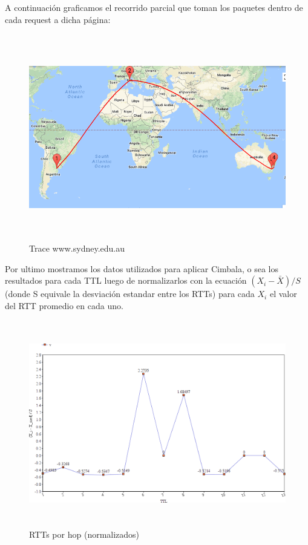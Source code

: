 \documentclass[a4paper,10pt]{article}
\begin{document}
\medskip
\par{A continuación graficamos el recorrido parcial que toman los paquetes dentro de cada request a dicha página: }
\medskip
\begin{figure}[H]
    \centering
    \includegraphics[height=9cm]{imagenes/australiaUni.png}
    \caption{Trace www.sydney.edu.au}
\end{figure}


\medskip
\medskip
\par{Por ultimo mostramos los datos utilizados para aplicar Cimbala, o sea los resultados para cada TTL luego de normalizarlos con la ecuación $(X_{i} - \bar{X}) /S $ (donde S equivale la desviación estandar entre los RTTs) para cada $X_{i}$ el valor del RTT promedio en cada uno.}

\medskip
\begin{figure}[H]
    \centering
    \includegraphics[height=9cm]{imagenes/auUniZVal.png}
    \caption{RTTs por hop (normalizados)}
\end{figure}
\end{document}
